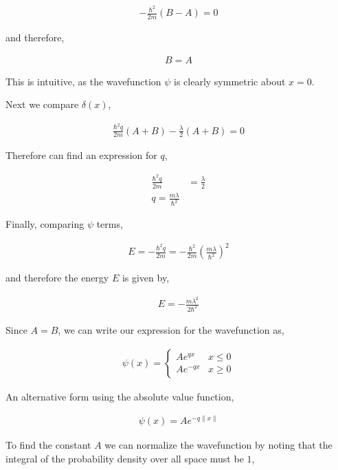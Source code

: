 \documentclass[11pt]{amsart}
\begin{document}
\begin{align*}
  -\frac{\hbar^2}{2m}(B-A)=0
\end{align*}

and therefore,

\begin{align*}
  B = A
\end{align*}

This is intuitive, as the wavefunction $\psi$ is clearly symmetric about $x = 0$.

Next we compare $\delta(x)$,

\begin{align*}
  \frac{\hbar^2q}{2m}(A+B)-\frac{\lambda}{2}(A+B) = 0
\end{align*}

Therefore can find an expression for $q$,

\begin{align*}
  \frac{\hbar^2q}{2m} &= \frac{\lambda}{2} \\
  q = \frac{m\lambda}{\hbar^2}
\end{align*}

Finally, comparing $\psi$ terms,

\begin{align*}
  E = -\frac{\hbar^2q}{2m} = -\frac{\hbar^2}{2m} {\left(\frac{m\lambda}{\hbar^2}\right)}^2
\end{align*}

and therefore the energy $E$ is given by,

\begin{align*}
  E = -\frac{m\lambda^2}{2\hbar^2}
\end{align*}

Since $A = B$, we can write our expression for the wavefunction as,

\begin{align*}
  \psi(x) =
  \begin{cases}
    Ae^{qx} & x \leq 0 \\
    Ae^{-qx} & x \geq 0
  \end{cases}
\end{align*}

An alternative form using the absolute value function,

\begin{align*}
  \psi(x) = Ae^{-q\|x\|}
\end{align*}

To find the constant $A$ we can normalize the wavefunction by noting that the integral of the probability density over all space must be $1$,
\end{document}
